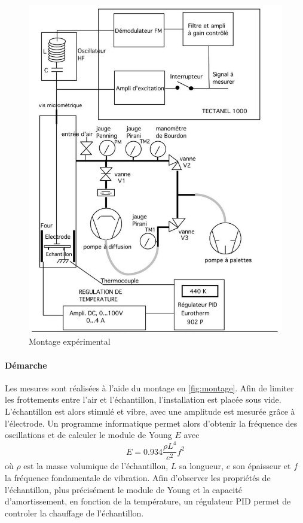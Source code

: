 
\begin{figure}
    \centering
    \includegraphics[width=\linewidth]{figures/montage.png}
    \caption{Montage expérimental \cite{notice}}
    \label{fig:montage}
\end{figure}

\paragraph{Démarche} Les mesures sont réalisées à l'aide du montage en \autoref{fig:montage}. Afin de limiter les frottements entre l'air et l'échantillon, l'installation est placée sous vide. L'échantillon est alors stimulé et vibre, avec une amplitude est mesurée grâce à l'électrode. Un programme informatique permet alors d'obtenir la fréquence des oscillations et de calculer le module de Young \(E\) avec
\begin{equation}
    E = 0.934 \frac{\rho L^4}{e^2}f^2
\end{equation}
où \(\rho\) est la masse volumique de l'échantillon, \(L\) sa longueur, \(e\) son épaisseur et \(f\) la fréquence fondamentale de vibration. Afin d'observer les propriétés de l'échantillon, plus précisément le module de Young et la capacité d'amortissement, en fonction de la température, un régulateur PID permet de controler la chauffage de l'échantillon.
